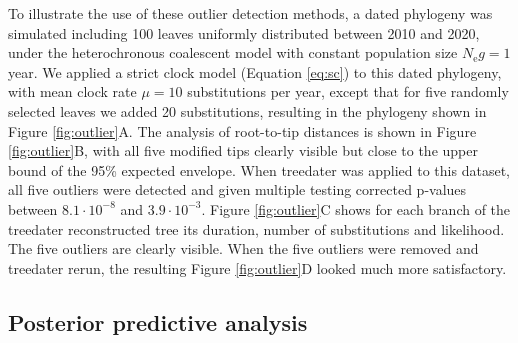 \documentclass{article}
\begin{document}
To illustrate the use of these outlier detection methods,  
a dated phylogeny was simulated including 100 leaves uniformly distributed between 2010 and 2020, 
under the heterochronous coalescent model \citep{Drummond2002}
with constant population size $N_\mathrm{e}g=1$ year. 
We applied a strict clock model (Equation \ref{eq:sc}) to this dated phylogeny,
with mean clock rate $\mu=10$ substitutions per year, except that for five randomly selected leaves
we added 20 substitutions, resulting in the phylogeny shown in Figure \ref{fig:outlier}A.
The analysis of root-to-tip distances is shown in Figure \ref{fig:outlier}B, with all five modified tips
clearly visible but close to the upper bound of the 95\% expected envelope. 
When treedater was applied to this dataset, all five outliers were detected and given multiple testing corrected
p-values between $8.1\cdot10^{-8}$ and $3.9\cdot10^{-3}$. Figure \ref{fig:outlier}C shows for each
branch of the treedater reconstructed tree its duration, number of substitutions and likelihood.
The five outliers are clearly visible. When the five outliers were removed and treedater rerun,
the resulting Figure \ref{fig:outlier}D looked much more satisfactory.

\subsection*{Posterior predictive analysis}
\end{document}
